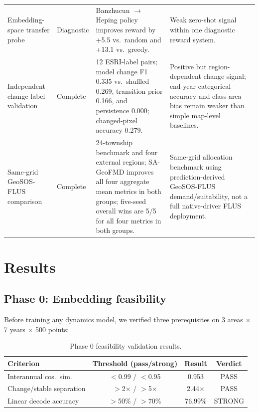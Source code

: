 \documentclass{article}
\begin{document}
\begin{table}[htbp]
\begin{tabular}{@{}P{0.20\textwidth}P{0.13\textwidth}P{0.35\textwidth}P{0.26\textwidth}@{}}
Embedding-space transfer probe & Diagnostic & Banzhucun $\to$ Heping policy improves reward by +5.5 vs.\ random and +13.1 vs.\ greedy. & Weak zero-shot signal within one diagnostic reward system. \\
Independent change-label validation & Complete & 12 ESRI-label pairs; model change F1 0.335 vs.\ shuffled 0.269, transition prior 0.166, and persistence 0.000; changed-pixel accuracy 0.279. & Positive but region-dependent change signal; end-year categorical accuracy and class-area bias remain weaker than simple map-level baselines. \\
Same-grid GeoSOS-FLUS comparison & Complete & 24-township benchmark and four external regions; SA-GeoFMD improves all four aggregate mean metrics in both groups; five-seed overall wins are 5/5 for all four metrics in both groups. & Same-grid allocation benchmark using prediction-derived GeoSOS-FLUS demand/suitability, not a full native-driver FLUS deployment. \\
\bottomrule
\end{tabular}
\end{table}


\section{Results}
\label{sec:results}

\subsection{Phase 0: Embedding feasibility}

Before training any dynamics model, we verified three prerequisites on 3 areas $\times$ 7 years $\times$ 500 points:

\begin{table}[htbp]
\centering
\caption{Phase 0 feasibility validation results.}
\label{tab:phase0}
\begin{tabular}{lccc}
\toprule
Criterion & Threshold (pass/strong) & Result & Verdict \\
\midrule
Interannual cos.~sim. & $<$0.99 / $<$0.95 & 0.953 & PASS \\
Change/stable separation & $>$2$\times$ / $>$5$\times$ & 2.44$\times$ & PASS \\
Linear decode accuracy & $>$50\% / $>$70\% & 76.99\% & STRONG \\
\bottomrule
\end{tabular}
\end{table}
\end{document}
